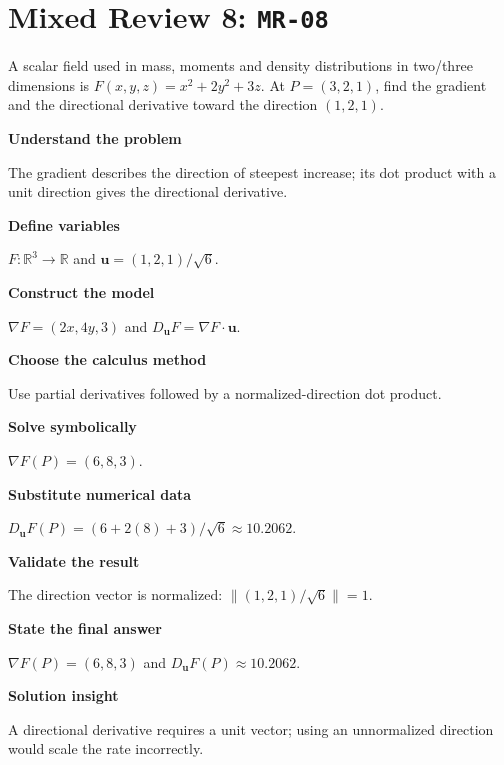 \documentclass[11pt]{book}
\newcommand{\pid}[1]{\texttt{#1}}
\begin{document}
\section*{Mixed Review 8: \pid{MR-08}}
\begin{problembox}A scalar field used in mass, moments and density distributions in two/three dimensions is $F(x,y,z)=x^2+2y^2+3z$. At $P=(3,2,1)$, find the gradient and the directional derivative toward the direction $(1,2,1)$.\end{problembox}
\begin{solutionbox}
\textbf{Understand the problem}\par The gradient describes the direction of steepest increase; its dot product with a unit direction gives the directional derivative.\par\medskip
\textbf{Define variables}\par $F:\mathbb R^3\to\mathbb R$ and $\mathbf u=(1,2,1)/\sqrt6$.\par\medskip
\textbf{Construct the model}\par $\nabla F=(2x,4y,3)$ and $D_{\mathbf u}F=\nabla F\cdot\mathbf u$.\par\medskip
\textbf{Choose the calculus method}\par Use partial derivatives followed by a normalized-direction dot product.\par\medskip
\textbf{Solve symbolically}\par $\nabla F(P)=(6,8,3)$.\par\medskip
\textbf{Substitute numerical data}\par $D_{\mathbf u}F(P)=(6+2(8)+3)/\sqrt6\approx 10.2062$.\par\medskip
\textbf{Validate the result}\par The direction vector is normalized: $\|(1,2,1)/\sqrt6\|=1$.\par\medskip
\textbf{State the final answer}\par $\nabla F(P)=(6,8,3)$ and $D_{\mathbf u}F(P)\approx 10.2062$.\par\medskip
\textbf{Solution insight}\par A directional derivative requires a unit vector; using an unnormalized direction would scale the rate incorrectly.\par\medskip
\end{solutionbox}
\end{document}
